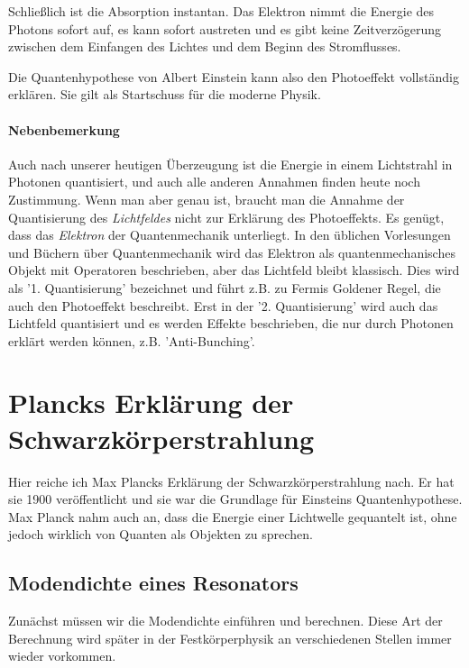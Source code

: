  Schließlich ist die Absorption instantan. Das Elektron nimmt die Energie des Photons sofort auf, es kann sofort austreten und es gibt keine Zeitverzögerung zwischen dem Einfangen des Lichtes und dem Beginn des Stromflusses.

 Die Quantenhypothese von Albert Einstein kann also den Photoeffekt vollständig erklären. Sie gilt als Startschuss für die moderne Physik.

 \paragraph*{Nebenbemerkung} Auch nach unserer heutigen Überzeugung ist die Energie in einem Lichtstrahl in Photonen quantisiert, und auch alle anderen Annahmen finden heute noch Zustimmung. Wenn man aber genau ist, braucht man die Annahme der Quantisierung des \emph{Lichtfeldes} nicht zur Erklärung des Photoeffekts. Es genügt, dass das \emph{Elektron} der Quantenmechanik unterliegt. In den üblichen Vorlesungen und Büchern über Quantenmechanik wird das Elektron als quantenmechanisches Objekt mit Operatoren beschrieben, aber das Lichtfeld bleibt klassisch. Dies wird als '1. Quantisierung' bezeichnet und führt z.B. zu Fermis Goldener Regel, die auch den Photoeffekt beschreibt. Erst in der '2. Quantisierung' wird auch das Lichtfeld quantisiert und es werden Effekte beschrieben, die nur durch Photonen erklärt werden können, z.B. 'Anti-Bunching'.


 \section{Plancks Erklärung der Schwarzkörperstrahlung}

Hier reiche ich Max Plancks Erklärung der Schwarzkörperstrahlung nach. Er hat sie 1900 veröffentlicht und sie war die Grundlage für Einsteins Quantenhypothese. Max Planck nahm auch an, dass die Energie einer Lichtwelle gequantelt ist, ohne jedoch wirklich von Quanten als Objekten zu sprechen.

\subsection{Modendichte eines Resonators}

Zunächst müssen wir die Modendichte einführen und berechnen. Diese Art der Berechnung wird später in der Festkörperphysik an verschiedenen Stellen immer wieder vorkommen.

